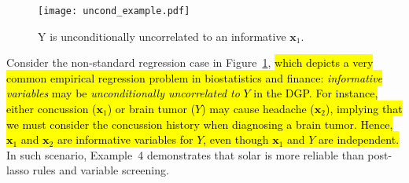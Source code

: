 \documentclass[11pt,review,authoryear]{elsarticle}
\begin{document}
\begin{figure}[h]
%
  \centering
  \texttt{[image: uncond\_example.pdf]}
  \caption{Y is unconditionally uncorrelated to an informative $\mathbf{x}_1$.}
  \label{fig:uncond_example}
%
\end{figure}

Consider the non-standard regression case in Figure~\ref{fig:uncond_example}, \hl{which depicts a very common empirical regression problem in biostatistics and finance: \emph{informative variables} may be \emph{unconditionally uncorrelated to} $Y$ in the DGP. For instance, either concussion ($\mathbf{x}_1$) or brain tumor ($Y$) may cause headache ($\mathbf{x}_2$), implying that we must consider the concussion history when diagnosing a brain tumor. Hence, $\mathbf{x}_1$ and $\mathbf{x}_2$ are informative variables for $Y$, even though $\mathbf{x}_1$ and $Y$ are independent.} In such scenario, Example~4 demonstrates that solar is more reliable than post-lasso rules and variable screening.
\end{document}

